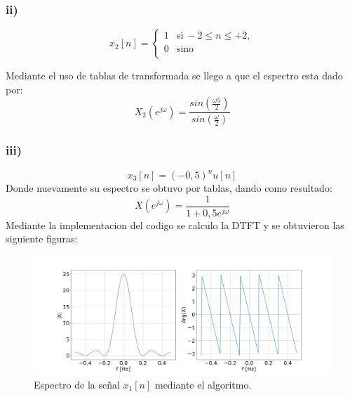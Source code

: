 \documentclass[11pt,a4paper]{article}
\begin{document}
    \subsubsection*{ii)}
    \begin{equation} 
        x_{2}[n] = \left\{ 
        \begin{array}{ll} 
        1 & \mathrm{si\ } -2\leq n \leq +2, \\
        0 & \mathrm{sino\ } \\
        \end{array} 
        \right.
    \end{equation}

    Mediante el uso de tablas de transformada se llego a que el espectro esta dado por:
    \begin{equation}
    X_{2}(e^{j \omega})= \frac{sin(\frac{ \omega 5}{2})}{sin (\frac{\omega}{2})}
    \end{equation}

    \subsubsection*{iii)}
    \begin{equation} 
        x_{3}[n]=(-0,5)^{n}u[n]
    \end{equation}
    Donde nuevamente su espectro se obtuvo por tablas, dando como resultado:
    \begin{equation}
    X(e^{j \omega})=\frac{1}{1+0,5 e^{j \omega}}
    \end{equation}
    Mediante la implementacion del codigo se calculo la DTFT y se obtuvieron las siguiente figuras:
    \begin{figure}[H]
    \centering
    \includegraphics[width=\textwidth]{Img/punto_3_e_1.png}
    \caption{Espectro de la señal $x_{1}[n]$ mediante el algoritmo.}
    \label{fig.3ei}
    \end{figure} 
\end{document}
